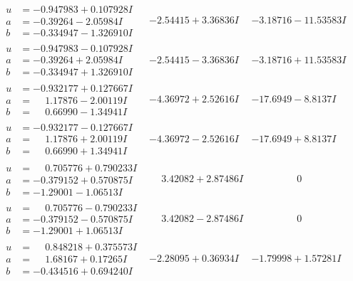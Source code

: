 \documentclass[1p]{elsarticle_modified}
\theoremstyle{definition}
\begin{document}
$$\begin{array}{c|c|c}
\begin{aligned}
u &= -0.947983 + 0.107928 I \\
a &= -0.39264 - 2.05984 I \\
b &= -0.334947 - 1.326910 I\end{aligned}
 & -2.54415 + 3.36836 I & -3.18716 - 11.53583 I \\ \hline\begin{aligned}
u &= -0.947983 - 0.107928 I \\
a &= -0.39264 + 2.05984 I \\
b &= -0.334947 + 1.326910 I\end{aligned}
 & -2.54415 - 3.36836 I & -3.18716 + 11.53583 I \\ \hline\begin{aligned}
u &= -0.932177 + 0.127667 I \\
a &= \phantom{-}1.17876 - 2.00119 I \\
b &= \phantom{-}0.66990 - 1.34941 I\end{aligned}
 & -4.36972 + 2.52616 I & -17.6949 - 8.8137 I \\ \hline\begin{aligned}
u &= -0.932177 - 0.127667 I \\
a &= \phantom{-}1.17876 + 2.00119 I \\
b &= \phantom{-}0.66990 + 1.34941 I\end{aligned}
 & -4.36972 - 2.52616 I & -17.6949 + 8.8137 I \\ \hline\begin{aligned}
u &= \phantom{-}0.705776 + 0.790233 I \\
a &= -0.379152 + 0.570875 I \\
b &= -1.29001 - 1.06513 I\end{aligned}
 & \phantom{-}3.42082 + 2.87486 I & \phantom{-0.000000 } 0 \\ \hline\begin{aligned}
u &= \phantom{-}0.705776 - 0.790233 I \\
a &= -0.379152 - 0.570875 I \\
b &= -1.29001 + 1.06513 I\end{aligned}
 & \phantom{-}3.42082 - 2.87486 I & \phantom{-0.000000 } 0 \\ \hline\begin{aligned}
u &= \phantom{-}0.848218 + 0.375573 I \\
a &= \phantom{-}1.68167 + 0.17265 I \\
b &= -0.434516 + 0.694240 I\end{aligned}
 & -2.28095 + 0.36934 I & -1.79998 + 1.57281 I \\ \hline\begin{aligned}

\end{aligned}
\end{array}$$
\end{document}
